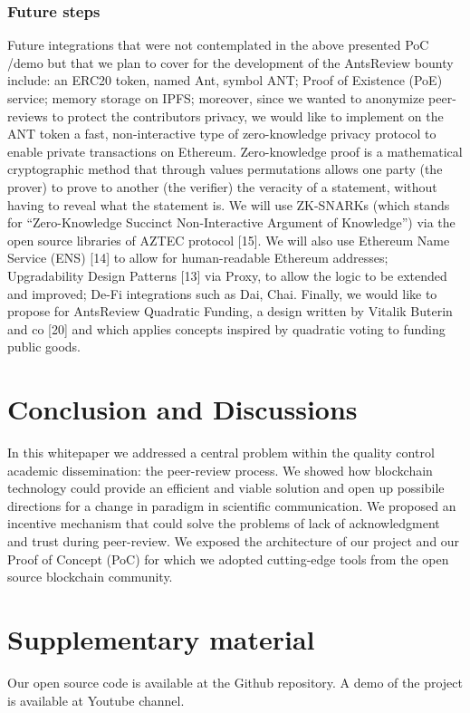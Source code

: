 \documentclass[runningheads]{llncs}
\begin{document}
\subsubsection{Future steps}
Future integrations that were not contemplated in the above presented PoC /demo but that we plan to cover for the development of the AntsReview bounty include: an ERC20 token, named Ant,  symbol ANT; Proof of Existence (PoE) service; memory storage on IPFS; moreover, since we wanted to anonymize peer-reviews to protect the contributors privacy, we would like to implement on the ANT token a fast, non-interactive type of zero-knowledge privacy protocol to enable private transactions on Ethereum. Zero-knowledge proof is a mathematical cryptographic method that through values permutations allows one party (the prover) to prove to another (the verifier) the veracity of a statement, without having to reveal what the statement is. We will use ZK-SNARKs (which stands for “Zero-Knowledge Succinct Non-Interactive Argument of Knowledge”) via the open source libraries of AZTEC protocol [15]. We will also use Ethereum Name Service (ENS) [14] to allow for human-readable Ethereum addresses; Upgradability Design Patterns [13] via Proxy, to allow the logic to be extended and improved; De-Fi integrations such as Dai, Chai. Finally, we would like to propose for AntsReview Quadratic Funding, a design written by Vitalik Buterin and co [20] and which applies concepts inspired by quadratic voting to funding public goods.

\section{Conclusion and Discussions}
In this whitepaper we addressed a central problem within the quality control academic dissemination: the peer-review process. We showed how blockchain technology could provide an efficient and viable solution and open up possibile directions for a change in paradigm in scientific communication. We proposed an incentive mechanism that could solve the problems of lack of acknowledgment and trust during peer-review. We exposed the architecture of our project and our Proof of Concept (PoC) for which we adopted cutting-edge tools from the open source blockchain community.

\section{Supplementary material}
Our open source code is available at the Github repository. A demo of the project is available at Youtube channel.
\end{document}
